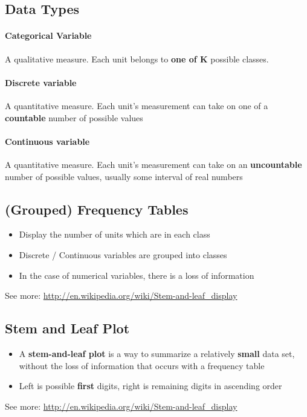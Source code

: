 \documentclass[12pt]{report}
\begin{document}
    \subsection{Data Types}
      \paragraph{Categorical Variable} A qualitative measure. Each unit belongs
      to \textbf{one of K} possible classes.

      \paragraph{Discrete variable} A quantitative measure. Each unit's
      measurement can take on one of a \textbf{countable} number of possible
      values

      \paragraph{Continuous variable} A quantitative measure. Each unit's
      measurement can take on an \textbf{uncountable} number of possible values,
      usually some interval of real numbers

    \subsection{(Grouped) Frequency Tables}
      \begin{itemize}
        \item Display the number of units which are in each class
        \item Discrete / Continuous variables are grouped into classes
        \item In the case of numerical variables, there is a loss of
          information
      \end{itemize}
      See more: \url{http://en.wikipedia.org/wiki/Stem-and-leaf_display}

    \subsection{Stem and Leaf Plot}
      \begin{itemize}
        \item A \textbf{stem-and-leaf plot} is a way to summarize a relatively
          \textbf{small} data set, without the loss of information that occurs
          with a frequency table
        \item Left is possible \textbf{first} digits, right is remaining digits
          in ascending order
      \end{itemize}
      See more: \url{http://en.wikipedia.org/wiki/Stem-and-leaf_display}
\end{document}
